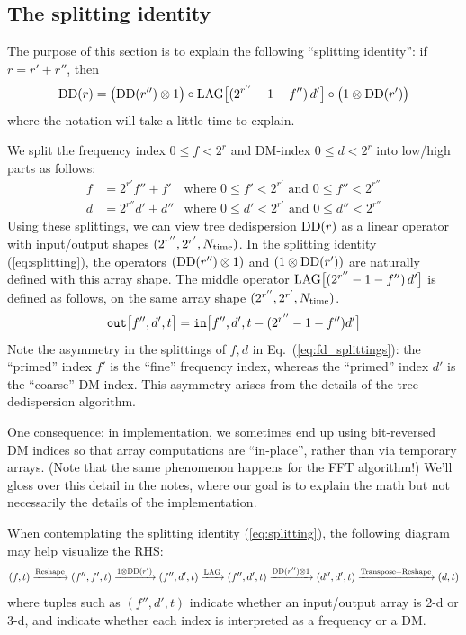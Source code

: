 \documentclass{article}
\numberwithin{equation}{section}   %
\def\DD{{\rm DD}}
\def\LAG{{\rm LAG}}
\def\nn{\nonumber}
\begin{document}
\subsection{The splitting identity}
\label{ssec:splitting_identity}

The purpose of this section is to explain the following ``splitting identity'':
if $r = r' + r''$, then
\begin{equation}
\DD(r) = \big( \DD(r'') \otimes 1 \big) \circ \LAG\big[ (2^{r''}-1-f'') \, d' \big] \circ \big( 1 \otimes \DD(r') \big)
  \label{eq:splitting}
\end{equation}
where the notation will take a little time to explain.

We split the frequency index $0 \le f < 2^r$ and DM-index $0 \le d < 2^r$ into low/high parts as follows:
\begin{align}
f &= 2^{r'} f'' + f' & \mbox{where } 0 \le f' < 2^{r'} \mbox{ and } 0 \le f'' < 2^{r''} \nn \\
d &= 2^{r''} d' + d'' & \mbox{where } 0 \le d' < 2^{r'} \mbox{ and } 0 \le d'' < 2^{r''} \label{eq:fd_splittings}
\end{align}
Using these splittings, we can view tree dedispersion $\DD(r)$ as a linear operator with
input/output shapes $(2^{r''}, 2^{r'}, N_{\rm time})$.
In the splitting identity (\ref{eq:splitting}), the operators $(\DD(r'') \otimes 1)$
and $(1 \otimes \DD(r'))$ are naturally defined with this array shape.
The middle operator $\LAG\big[ (2^{r''}-1-f'') \, d' \big]$ is defined as follows,
on the same array shape $(2^{r''}, 2^{r'}, N_{\rm time})$.
\begin{equation}
{\tt out}\big[ f'', d', t \big] = {\tt in}\big[f'', d', t - (2^{r''}-1-f'') d' \big]
\end{equation}
Note the asymmetry in the splittings of $f,d$ in Eq.\ (\ref{eq:fd_splittings}): the ``primed''
index $f'$ is the ``fine'' frequency index, whereas the ``primed'' index $d'$ is the ``coarse''
DM-index. This asymmetry arises from the details of the tree dedispersion algorithm. 

One consequence: in implementation, we sometimes end up using bit-reversed DM indices
so that array computations are ``in-place'', rather than via temporary arrays.
(Note that the same phenomenon happens for the FFT algorithm!)
We'll gloss over this detail in the notes, where our goal is to explain the math but
not necessarily the details of the implementation.

When contemplating the splitting identity (\ref{eq:splitting}), the following diagram
may help visualize the RHS:
\begin{equation}
(f,t) \xrightarrow{\rm Reshape} (f'',f',t)
 \xrightarrow{ 1 \otimes \DD(r')} (f'',d',t)
 \xrightarrow{\rm LAG} (f'',d',t)
 \xrightarrow{\DD(r'') \otimes 1} (d'',d',t)
 \xrightarrow{\rm Transpose + Reshape} (d,t)
\end{equation}
where tuples such as $(f'',d',t)$ indicate whether an input/output array is 2-d or 3-d,
and indicate whether each index is interpreted as a frequency or a DM.
\end{document}

